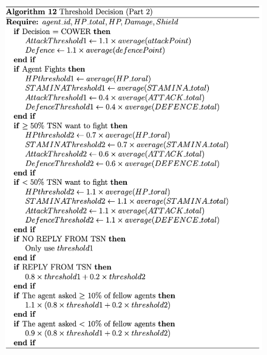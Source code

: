 \begin{figure}[htb]
    \centering
    \includegraphics[scale=0.7]{006_team_3_agent_design/FIGS/Algo12.png}
    \label{fig:algo12}
\end{figure}

